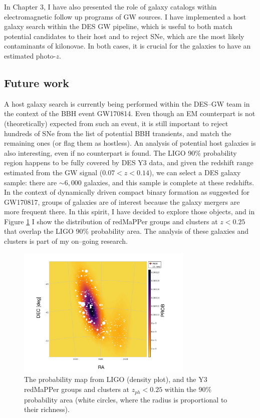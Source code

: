 In Chapter 3, I have also presented the role of galaxy catalogs within electromagnetic follow up programs of GW sources. I have implemented a host galaxy search within the DES GW pipeline, which is useful to both match potential candidates to their host and to reject SNe, which are the most likely contaminants of kilonovae. In both cases, it is crucial for the galaxies to have an estimated photo-$z$. 

\subsection{Future work}
A host galaxy search is currently being performed within the DES--GW team in the context of the BBH event GW170814. Even though an EM counterpart is not (theoretically) expected from such an event, it is still important to reject hundreds of SNe from the list of potential BBH transients, and match the remaining ones (or flag them as hostless). An analysis of potential host galaxies is also interesting, even if no counterpart is found. The LIGO 90\% probability region happens to be fully covered by DES Y3 data, and given the redshift range estimated from the GW signal ($0.07<z<0.14$), we can select a DES galaxy sample: there are $\sim 6,000$ galaxies, and this sample is complete at these redshifts. In the context of dynamically driven compact binary formation as suggested for GW170817, groups of galaxies are of interest because the galaxy mergers are more frequent there. In this spirit, I have decided to explore those objects, and in Figure \ref{fig:GW170814} I show the distribution of redMaPPer groups and clusters at $z<0.25$ that overlap the LIGO 90\% probability area. The analysis of these galaxies and clusters is part of my on--going research. 

\begin{figure}
\centering
\includegraphics[width=0.75\textwidth]{./chapters/chapter8/GW170814.pdf}
\caption{The probability map from LIGO (density plot), and the Y3 redMaPPer groups and clusters at $z_{ph}<0.25$ within the 90\% probability area (white circles, where the radius is proportional to their richness).}\label{fig:GW170814}\end{figure}

